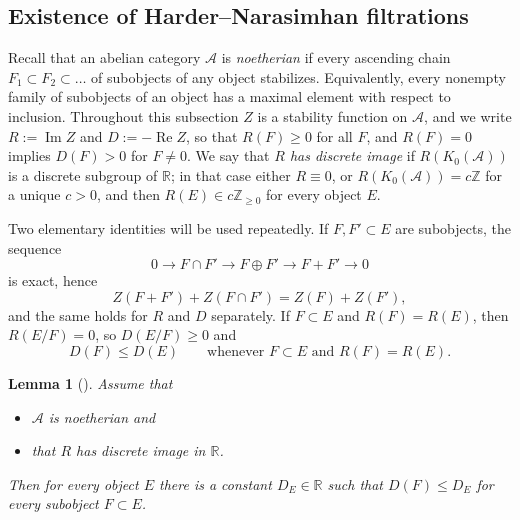 \documentclass[12pt]{amsart}
\newtheorem{lemma}[theorem]{Lemma}
\numberwithin{theorem}{section}
\theoremstyle{definition}
\newcommand{\RR}{\mathbb{R}}
\newcommand{\ZZ}{\mathbb{Z}}
\newcommand{\calA}{\mathcal{A}}
\newcommand{\Kgroup}{K_0}
\newcommand{\re}{\operatorname{Re}}
\newcommand{\im}{\operatorname{Im}}
\begin{document}
	
	\subsection{Existence of Harder--Narasimhan filtrations}
	
	Recall that an abelian category $\calA$ is \emph{noetherian} if every ascending chain $F_1 \subset F_2 \subset \ldots$ of subobjects of any object stabilizes.
	Equivalently, every nonempty family of subobjects of an object has a maximal element with respect to inclusion.
	Throughout this subsection $Z$ is a stability function on $\calA$, and we write $R := \im Z$ and $D := -\re Z$, so that $R(F) \geqslant 0$ for all $F$, and $R(F) = 0$ implies $D(F) > 0$ for $F \neq 0$.
	We say that \emph{$R$ has discrete image} if $R(\Kgroup(\calA))$ is a discrete subgroup of $\RR$;
	in that case either $R \equiv 0$, or $R(\Kgroup(\calA)) = c \ZZ$ for a unique $c > 0$, and then $R(E) \in c \ZZ_{\geqslant 0}$ for every object $E$.
	
	Two elementary identities will be used repeatedly.
	If $F, F' \subset E$ are subobjects, the sequence
	\[
	0 \to F \cap F' \to F \oplus F' \to F + F' \to 0
	\]
	is exact, hence
	\begin{equation}
		\label{eq:modular}
		Z(F + F') + Z(F \cap F') = Z(F) + Z(F') ,
	\end{equation}
	and the same holds for $R$ and $D$ separately.
	If $F \subset E$ and $R(F) = R(E)$, then $R(E / F) = 0$, so $D(E / F) \geqslant 0$ and
	\begin{equation}
		\label{eq:same_rank}
		D(F) \leqslant D(E) \qquad \text{whenever } F \subset E \text{ and } R(F) = R(E).
	\end{equation}
	
	\begin{lemma}[{\cite[Lemma~4.9]{MS17}}]
		\label{lem:D_bounded}
		Assume that
		\begin{itemize}
			\item $\calA$ is noetherian and
			\item that $R$ has discrete image in $ \mathbb{R} $.
		\end{itemize}
		Then for every object $E$ there is a constant $D_E \in \RR$ such that $D(F) \leqslant D_E$ for every subobject $F \subset E$.
	\end{lemma}
	
\end{document}
